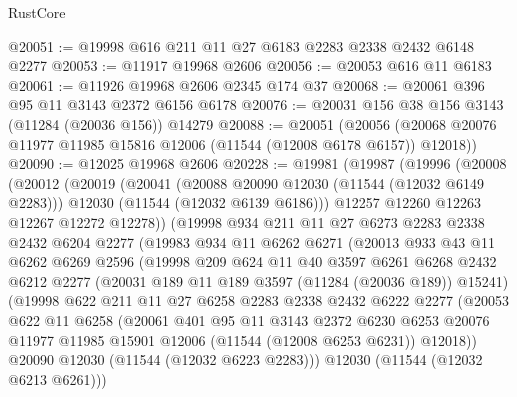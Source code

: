 \begin{lexlean}{RustCore}
\begin{coremodule}
@20051 := @19998 @616 @211 @11 @27 @6183 @2283 @2338 @2432 @6148 @2277
@20053 := @11917 @19968 @2606
@20056 := @20053 @616 @11 @6183
@20061 := @11926 @19968 @2606 @2345 @174 @37
@20068 := @20061 @396 @95 @11 @3143 @2372 @6156 @6178
@20076 := @20031 @156 @38 @156 @3143 (@11284 (@20036 @156)) @14279
@20088 := @20051
    (@20056 (@20068 @20076 @11977 @11985 @15816 @12006 (@11544 (@12008 @6178 @6157)) @12018))
@20090 := @12025 @19968 @2606
@20228 := @19981
    (@19987
      (@19996
        (@20008
          (@20012
            (@20019
              (@20041
                (@20088 @20090 @12030 (@11544 (@12032 @6149 @2283)))
                @12030
                (@11544 (@12032 @6139 @6186)))
              @12257
              @12260
              @12263
              @12267
              @12272
              @12278))
          (@19998
            @934
            @211
            @11
            @27
            @6273
            @2283
            @2338
            @2432
            @6204
            @2277
            (@19983
              @934
              @11
              @6262
              @6271
              (@20013
                @933
                @43
                @11
                @6262
                @6269
                @2596
                (@19998
                  @209
                  @624
                  @11
                  @40
                  @3597
                  @6261
                  @6268
                  @2432
                  @6212
                  @2277
                  (@20031 @189 @11 @189 @3597 (@11284 (@20036 @189)) @15241)
                  (@19998
                    @622
                    @211
                    @11
                    @27
                    @6258
                    @2283
                    @2338
                    @2432
                    @6222
                    @2277
                    (@20053
                      @622
                      @11
                      @6258
                      (@20061
                        @401
                        @95
                        @11
                        @3143
                        @2372
                        @6230
                        @6253
                        @20076
                        @11977
                        @11985
                        @15901
                        @12006
                        (@11544 (@12008 @6253 @6231))
                        @12018))
                    @20090
                    @12030
                    (@11544 (@12032 @6223 @2283)))
                  @12030
                  (@11544 (@12032 @6213 @6261)))

\end{coremodule}
\end{lexlean}
